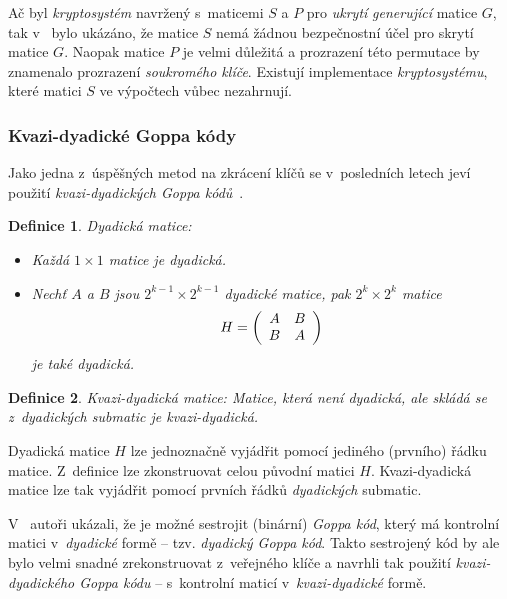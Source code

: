\documentclass[thesis=M,czech,hidelinks]{FITthesis}[2012/06/26]
\newcommand{\0}{{\textcolor[gray]{0.80}{0}}}
\newtheorem{definice}{Definice}
\begin{document}
Ač byl \emph{kryptosystém} navržený s~maticemi $S$ a $P$ pro \emph{ukrytí}
\emph{generující} matice $G$, tak v~\cite{Engelbert} bylo ukázáno, že matice $S$
nemá žádnou bezpečnostní účel pro skrytí matice $G$. Naopak matice $P$ je velmi
důležitá a prozrazení této permutace by znamenalo prozrazení \emph{soukromého
klíče}. Existují implementace \emph{kryptosystému}, které matici $S$ ve
výpočtech vůbec nezahrnují.


\subsubsection{Kvazi-dyadické Goppa kódy}\label{kap_kvazi}

Jako jedna z~úspěšných metod na zkrácení klíčů se v~posledních letech jeví
použití \emph{kvazi-dyadických Goppa kódů}~\cite{Misoczki1}.

\begin{definice}{Dyadická matice:}
    \begin{itemize}
        \item Každá $1\times1$ matice je \emph{dyadická}. \\

        \item Nechť $A$ a $B$ jsou $2^{k-1}\times2^{k-1}$ \emph{dyadické}
            matice, pak
            $2^k\times2^k$ matice
            $$
                H = \left(\begin{array}{c c}
                    A & B\\
                    B & A
                \end{array}\right)
            $$
            je také \emph{dyadická}.

    \end{itemize}
\end{definice}


\begin{definice}{Kvazi-dyadická matice:}
    Matice, která není \emph{dyadická}, ale skládá se z~\emph{dyadických}
    submatic je \emph{kvazi-dyadická}.
\end{definice}

Dyadická matice $H$ lze jednoznačně vyjádřit pomocí jediného (prvního) řádku
matice. Z~definice lze zkonstruovat celou původní matici $H$. Kvazi-dyadická
matice lze tak vyjádřit pomocí prvních řádků \emph{dyadických} submatic.


V~\cite{Misoczki1} autoři ukázali, že je možné sestrojit (binární) \emph{Goppa
kód}, který má kontrolní matici v~\emph{dyadické} formě -- tzv. \emph{dyadický
Goppa kód}. Takto sestrojený kód by ale bylo velmi snadné zrekonstruovat
z~veřejného klíče a navrhli tak použití \emph{kvazi-dyadického Goppa kódu} --
s~kontrolní maticí v~\emph{kvazi-dyadické} formě.
\end{document}
